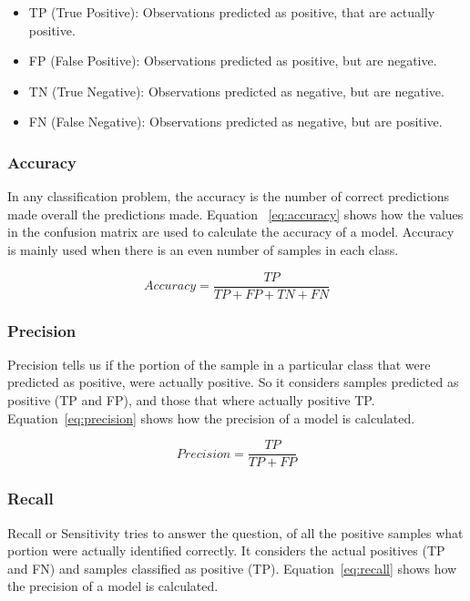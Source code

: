 \documentclass[12pt, a4paper,oneside]{report}
\begin{document}
\begin{itemize}
	\item TP (True Positive): Observations predicted as positive, that are actually positive.
	\item FP (False Positive): Observations predicted as positive, but are negative.
	\item TN (True Negative): Observations predicted as negative, but are negative.
	\item FN (False Negative): Observations predicted as negative, but are positive.
\end{itemize}

\subsubsection{Accuracy}
In any classification problem, the accuracy is the number of correct predictions made overall the predictions made. Equation ~\ref{eq:accuracy} shows how the values in the confusion matrix are used to calculate the accuracy of a model. Accuracy is mainly used when there is an even number of samples in each class.

\begin{equation}
Accuracy = \frac{TP}{TP + FP + TN + FN} \label{eq:accuracy}
\end{equation}


\subsubsection{Precision}
Precision tells us if the portion of the sample in a particular class that were predicted as positive, were actually positive. So it considers samples predicted as positive (TP and FP), and those that where actually positive TP. Equation~\ref{eq:precision} shows how the precision of a model is calculated.

\begin{equation}
Precision = \frac{TP}{TP + FP} \label{eq:precision}
\end{equation}

\subsubsection{Recall}
Recall or Sensitivity tries to answer the question, of all the positive samples what portion were actually identified correctly.
It considers the actual positives (TP and FN) and samples classified as positive (TP).
Equation~\ref{eq:recall} shows how the precision of a model is calculated.
\end{document}
